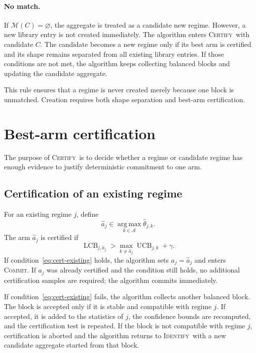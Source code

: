 \documentclass[11pt]{article}
\newcommand{\A}{\mathcal A}
\newcommand{\argmax}{\operatorname*{arg\,max}}
\newcommand{\LCB}{\operatorname{LCB}}
\newcommand{\UCB}{\operatorname{UCB}}
\newcommand{\ID}{\textsc{Identify}}
\newcommand{\CERT}{\textsc{Certify}}
\newcommand{\COMMIT}{\textsc{Commit}}
\begin{document}
\paragraph{No match.}
If $\mathcal M(C)=\varnothing$, the aggregate is treated as a candidate new regime. However, a new library entry is not created immediately. The algorithm enters \CERT\ with candidate $C$. The candidate becomes a new regime only if its best arm is certified and its shape remains separated from all existing library entries. If those conditions are not met, the algorithm keeps collecting balanced blocks and updating the candidate aggregate.

This rule ensures that a regime is never created merely because one block is unmatched. Creation requires both shape separation and best-arm certification.

\section{Best-arm certification}

The purpose of \CERT\ is to decide whether a regime or candidate regime has enough evidence to justify deterministic commitment to one arm.

\subsection{Certification of an existing regime}

For an existing regime $j$, define
\begin{equation}
    \widehat a_j\in\argmax_{k\in\A}\widehat\theta_{j,k}.
\end{equation}
The arm $\widehat a_j$ is certified if
\begin{equation}
    \LCB_{j,\widehat a_j}
    >
    \max_{k\neq \widehat a_j}\UCB_{j,k}+\gamma.
    \label{eq:cert-existing}
\end{equation}
If condition~\eqref{eq:cert-existing} holds, the algorithm sets $a_j=\widehat a_j$ and enters \COMMIT. If $a_j$ was already certified and the condition still holds, no additional certification samples are required; the algorithm commits immediately.

If condition~\eqref{eq:cert-existing} fails, the algorithm collects another balanced block. The block is accepted only if it is stable and compatible with regime $j$. If accepted, it is added to the statistics of $j$, the confidence bounds are recomputed, and the certification test is repeated. If the block is not compatible with regime $j$, certification is aborted and the algorithm returns to \ID\ with a new candidate aggregate started from that block.
\end{document}
